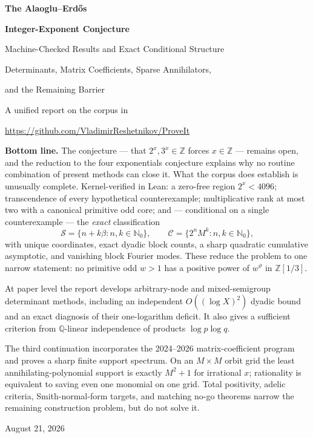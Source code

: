 \documentclass[11pt,oneside]{article}
\theoremstyle{definition}
\theoremstyle{remark}
\newcommand{\Nzero}{\mathbb N_0}
\newcommand{\Z}{\mathbb Z}
\newcommand{\Q}{\mathbb Q}
\newcommand{\thetaq}{\vartheta}
\newcommand{\Sol}{\mathcal S}
\newcommand{\Cand}{\mathcal C}
\newcommand{\Zthree}{\Z[1/3]}
\begin{document}

\begin{titlepage}
\centering
\vspace*{0.75cm}
{\Huge\bfseries The Alaoglu--Erd\H{o}s\par}
\vspace{0.2cm}
{\Huge\bfseries Integer-Exponent Conjecture\par}
\vspace{0.65cm}
{\Large Machine-Checked Results and Exact Conditional Structure\par}
\vspace{0.10cm}
{\Large Determinants, Matrix Coefficients, Sparse Annihilators,\par}
\vspace{0.10cm}
{\Large and the Remaining Barrier\par}
\vspace{0.72cm}
{\large A unified report on the corpus in\par}
\vspace{0.12cm}
{\large \url{https://github.com/VladimirReshetnikov/ProveIt}\par}
\vfill
\begin{minipage}{0.9\textwidth}
\small
\textbf{Bottom line.}
The conjecture --- that $2^x,3^x\in\Z$ forces $x\in\Z$ --- remains open, and the reduction to
the four exponentials conjecture explains why no routine combination of present methods can
close it.  What the corpus does establish is unusually complete.  Kernel-verified in Lean: a
zero-free region $2^x<4096$; transcendence of every hypothetical counterexample; multiplicative
rank at most two with a canonical primitive odd core; and --- conditional on a single
counterexample --- the \emph{exact} classification
\[
  \Sol=\{n+k\beta:n,k\in\Nzero\},
  \qquad
  \Cand=\{2^nM^k:n,k\in\Nzero\},
\]
with unique coordinates, exact dyadic block counts, a sharp quadratic cumulative asymptotic,
and vanishing block Fourier modes.  These reduce the problem to one narrow statement: no
primitive odd $w>1$ has a positive power of $w^{\thetaq}$ in $\Zthree$.

At paper level the report develops arbitrary-node and mixed-semigroup determinant methods,
including an independent $O((\log X)^2)$ dyadic bound and an exact diagnosis of their
one-logarithm deficit.  It also gives a sufficient criterion from $\Q$-linear independence of
products $\log p\log q$.

The third continuation incorporates the 2024--2026 matrix-coefficient program and proves a
sharp finite support spectrum.  On an $M\times M$ orbit grid the least annihilating-polynomial
support is exactly $M^2+1$ for irrational $x$; rationality is equivalent to saving even one
monomial on one grid.  Total positivity, adelic criteria, Smith-normal-form targets, and
matching no-go theorems narrow the remaining construction problem, but do not solve it.
\end{minipage}
\vfill
{\large August 21, 2026\par}
\end{titlepage}
\end{document}
